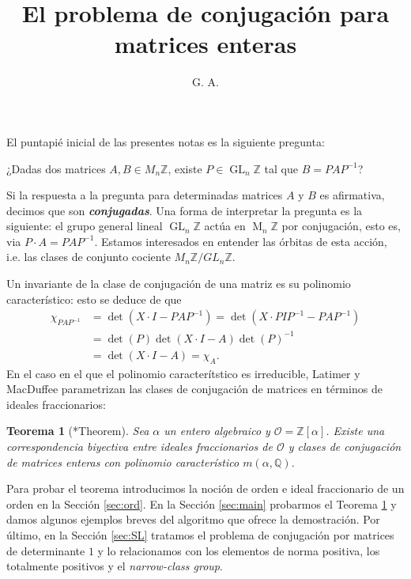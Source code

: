 \documentclass[11pt,a4paper]{amsart}
\title[El problema de conjugación para matrices enteras]{El problema
de conjugación para matrices enteras}
\author{G. A.}
\date{}
\newcommand{\Q}{\mathbb{Q}}
\newcommand{\Z}{\mathbb{Z}}
\renewcommand{\emph}[1]{\textbf{\textit{#1}}}
\DeclareMathOperator{\M}{M}
\DeclareMathOperator{\GL}{GL}
\numberwithin{equation}{section}
\theoremstyle{plain}
\newtheorem{introthm}{Teorema}
\begin{document}
\maketitle

El puntapié inicial de las presentes notas es la siguiente pregunta:


\begin{tcolorbox}[colback=thmcol!30, sharp corners, colframe=white]
\begin{center}
¿Dadas dos matrices $A, B \in M_n \Z$, existe $P \in \GL_n \Z$
tal que $B = PAP^{-1}$?
\end{center}
\end{tcolorbox}

Si la respuesta a la pregunta para determinadas matrices
$A$ y $B$ es afirmativa, decimos que son \emph{conjugadas}.
Una forma de interpretar la pregunta es la siguiente: el grupo general
lineal $\GL_n \Z$ actúa en $\M_n \Z$ por conjugación, esto es,
via $P\cdot A = PAP^{-1}$. Estamos interesados en entender las órbitas
de esta acción, i.e. las clases de conjunto cociente $M_n \Z/GL_n \Z$.

Un invariante de la clase de conjugación
de una matriz es su polinomio característico: esto se deduce de que
\begin{align*}
\chi_{PAP^{-1}} &= \det(X \cdot I - PAP^{-1}) =
\det(X \cdot PIP^{-1} - PAP^{-1}) \\&= \det(P)\det(X \cdot I - A)\det(P)^{-1}
\\&= \det(X \cdot I - A) = \chi_A.
\end{align*}
En el caso en el que el polinomio caracterítstico es irreducible,
Latimer y MacDuffee parametrizan las clases de conjugación
de matrices en términos de ideales
fraccionarios:

\begin{tcolorbox}[colback=thmcol!30, sharp corners, colframe=white]
\begin{introthm}[\cite{lm}*{Theorem}]\label{thm:main} Sea $\alpha$
un entero algebraico y $\mathcal O = \Z[\alpha]$. Existe una correspondencia
biyectiva entre ideales fraccionarios de $\mathcal O$ y clases de
conjugación de matrices enteras con polinomio característico $m(\alpha, \Q)$.
\end{introthm}
\end{tcolorbox}

Para probar el teorema introducimos la noción de orden
e ideal fraccionario de un orden en la Sección \ref{sec:ord}.
En la Sección \ref{sec:main} probarmos el Teorema \ref{thm:main}
y damos algunos ejemplos breves del algoritmo que ofrece la demostración.
Por último, en la Sección \ref{sec:SL} tratamos el problema de conjugación
por matrices de determinante $1$ y lo relacionamos con los elementos de norma
positiva, los totalmente positivos y el \textit{narrow-class group}.
\end{document}
